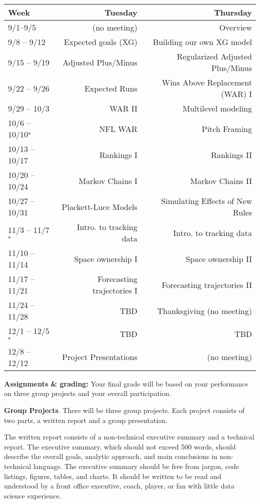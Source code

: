 \documentclass[11pt]{article}
\begin{document}
\begin{table}[h]
\centering
{\small
\begin{tabular}{lrr} \hline
Week & Tuesday & Thursday  \\ \hline
9/1--9/5 & (no meeting) & Overview  \\
9/8 -- 9/12 & Expected goals (XG) & Building our own XG model \\ 
9/15 -- 9/19 & Adjusted Plus/Minus & Regularized Adjusted Plus/Minus \\
9/22 -- 9/26 & Expected Runs & Wins Above Replacement (WAR) I \\
9/29 -- 10/3 & WAR II & Multilevel modeling  \\ %
10/6 -- 10/10$^{\star}$ & NFL WAR  & Pitch Framing  \\ 
10/13 -- 10/17 & Rankings I & Rankings II \\
10/20 -- 10/24 & Markov Chains I & Markov Chains II  \\  %
10/27 -- 10/31 & Plackett-Luce Models & Simulating Effects of New Rules \\ %
11/3 -- 11/7$^{\star}$ & Intro. to tracking data & Intro. to tracking data \\ %
11/10 -- 11/14 & Space ownership I & Space ownership II \\  %
11/17 -- 11/21 & Forecasting trajectories I & Forecasting trajectories II \\
11/24 -- 11/28 & TBD & Thanksgiving (no meeting) \\
12/1 -- 12/5$^{\star}$ & TBD & TBD  \\
12/8 -- 12/12 & Project Presentations & (no meeting) \\ \hline
\end{tabular}
}
\end{table}


\textbf{Assignments \& grading:} Your final grade will be based on your performance on three group projects and your overall participation.


\textbf{Group Projects}. There will be three group projects. Each project consists of two parts, a written report and a group presentation.

The written report consists of a non-technical executive summary and a technical report.
The executive summary, which should not exceed 500 words, should describe the overall goals, analytic approach, and main conclusions in non-technical language.
The executive summary should be free from jargon, code listings, figures, tables, and charts.
It should be written to be read and understood by a front office executive, coach, player, or fan with little data science experience.
\end{document}
